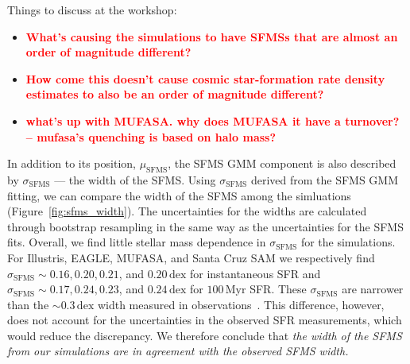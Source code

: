 \documentclass[preprint2,tighten]{aastex62}
\newcommand{\todo}[1]{{\bf \textcolor{red}{ #1}}}
\begin{document}
Things to discuss at the workshop: 
\begin{itemize}
\item \todo{What's causing the simulations to have SFMSs that are almost an 
order of magnitude different?} 
\item \todo{How come this doesn't cause cosmic star-formation rate 
density estimates to also be an order of magnitude different?}
\item \todo{what's up with MUFASA. why does MUFASA it have a turnover? -- 
mufasa's quenching is based on halo mass?}
\end{itemize}

In addition to its position, $\mu_\mathrm{SFMS}$, the SFMS GMM component 
is also described by $\sigma_\mathrm{SFMS}$ --- the width of the SFMS. 
Using $\sigma_\mathrm{SFMS}$ derived from the SFMS GMM fitting, 
we can compare the width of the SFMS among the simluations 
(Figure~\ref{fig:sfms_width}). The uncertainties for the widths are 
calculated through bootstrap resampling in the same way as the 
uncertainties for the SFMS fits. Overall, we find little stellar mass 
dependence in $\sigma_\mathrm{SFMS}$ for the simulations. For Illustris, 
EAGLE, MUFASA, and Santa Cruz SAM we respectively find 
$\sigma_\mathrm{SFMS} \sim 0.16, 0.20, 0.21$, and $0.20\,\mathrm{dex}$ 
for instantaneous SFR and
$\sigma_\mathrm{SFMS} \sim 0.17, 0.24, 0.23$, and $0.24\,\mathrm{dex}$
for $100\,\mathrm{Myr}$ SFR. These $\sigma_\mathrm{SFMS}$ are narrower 
than the ${\sim}0.3\,\mathrm{dex}$ width measured in 
observations~\citep[\emph{e.g.}][]{daddi2007, noeske2007, magdis2012, whitaker2012}. 
This difference, however, does not account for the uncertainties in the 
observed SFR measurements, which would reduce the discrepancy. We 
therefore conclude that \emph{the width of the SFMS from our 
simulations are in agreement with the observed SFMS width.}
\end{document}
